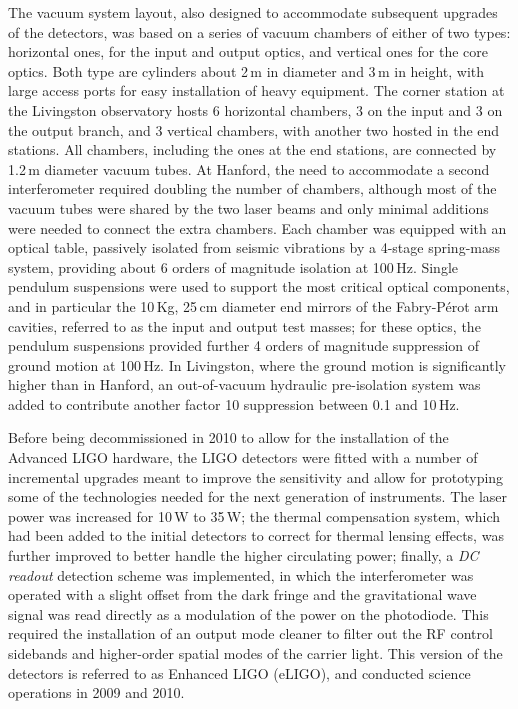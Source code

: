 The vacuum system layout, also designed to accommodate subsequent upgrades of the detectors, was based on a series of vacuum chambers of either of two types: horizontal ones, for the input and output optics, and vertical ones for the core optics.
Both type are cylinders about 2\,m in diameter and 3\,m in height, with large access ports for easy installation of heavy equipment.
The corner station at the Livingston observatory hosts 6 horizontal chambers, 3 on the input and 3  on the output branch, and 3 vertical chambers, with another two hosted in the end stations.
All chambers, including the ones at the end stations, are connected by 1.2\,m diameter vacuum tubes.
At Hanford, the need to accommodate a second interferometer required doubling the number of chambers, although most of the vacuum tubes were shared by the two laser beams and only minimal additions were needed to connect the extra chambers.
Each chamber was equipped with an optical table, passively isolated from seismic vibrations by a 4-stage spring-mass system, providing about 6 orders of magnitude isolation at 100\,Hz\cite{Giaime_1996}.
Single pendulum suspensions were used to support the most critical optical components, and in particular the 10\,Kg, 25\,cm diameter end mirrors of the Fabry-P\'{e}rot arm cavities, referred to as the input and output test masses; for these optics, the pendulum suspensions provided further 4 orders of magnitude suppression of ground motion at 100\,Hz.
In Livingston, where the ground motion is significantly higher than in Hanford, an out-of-vacuum hydraulic pre-isolation system was added to contribute another factor 10 suppression between 0.1 and 10\,Hz.

Before being decommissioned in 2010 to allow for the installation of the Advanced LIGO hardware, the LIGO detectors were fitted with a number of incremental upgrades\cite{Aasi_2015} meant to improve the sensitivity and allow for prototyping some of the technologies needed for the next generation of instruments.
The laser power was increased for 10\,W to 35\,W;
the thermal compensation system, which had been added to the initial detectors to correct for thermal lensing effects, was further improved to better handle the higher circulating power;
finally, a \textit{DC readout} detection scheme was implemented, in which the interferometer was operated with a slight offset from the dark fringe and the gravitational wave signal was read directly as a modulation of the power on the photodiode.
This required the installation of an output mode cleaner to filter out the RF control sidebands and higher-order spatial modes of the carrier light.
This version of the detectors is referred to as Enhanced LIGO (eLIGO), and conducted science operations in 2009 and 2010. 

